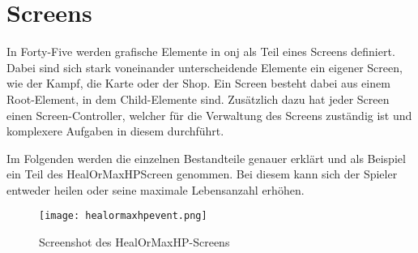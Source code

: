 \renewcommand{\kapitelautor}{Autor: Felix Zwickelstorfer}
\section{Screens}\label{sec:screens}
\renewcommand{\kapitelautor}{Autor: Felix Zwickelstorfer}
In Forty-Five werden grafische Elemente in onj als Teil eines Screens definiert.
Dabei sind sich stark voneinander unterscheidende Elemente ein eigener Screen, wie \zB der Kampf, die Karte oder der Shop.
Ein Screen besteht dabei aus einem Root-Element, in dem Child-Elemente sind.
Zusätzlich dazu hat jeder Screen einen Screen-Controller, welcher für die Verwaltung des Screens zuständig ist und komplexere Aufgaben in diesem durchführt.

Im Folgenden werden die einzelnen Bestandteile genauer erklärt und als Beispiel ein Teil des HealOrMaxHPScreen genommen.
Bei diesem kann sich der Spieler entweder heilen oder seine maximale Lebensanzahl erhöhen.
\begin{figure}[H]
    \centering
    \texttt{[image: healormaxhpevent.png]}
    \caption{Screenshot des HealOrMaxHP-Screens}
\end{figure}



